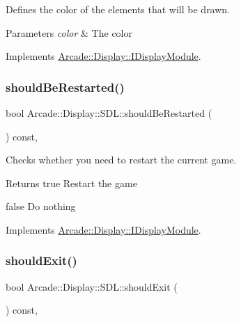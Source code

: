 Defines the color of the elements that will be drawn. 


\begin{DoxyParams}{Parameters}
{\em color} & The color \\
\hline
\end{DoxyParams}


Implements \mbox{\hyperlink{classArcade_1_1Display_1_1IDisplayModule_a9f81148f93a249d6fc91307819911b4e}{Arcade\+::\+Display\+::\+I\+Display\+Module}}.

\mbox{\label{classArcade_1_1Display_1_1SDL_aaeeb1aa505c0eab3c8b5c34265c89845}} 
\subsubsection{\texorpdfstring{shouldBeRestarted()}{shouldBeRestarted()}}
{\footnotesize\ttfamily bool Arcade\+::\+Display\+::\+S\+D\+L\+::should\+Be\+Restarted (\begin{DoxyParamCaption}{ }\end{DoxyParamCaption}) const\hspace{0.3cm}{\ttfamily [final]}, {\ttfamily [virtual]}}



Checks whether you need to restart the current game. 

\begin{DoxyReturn}{Returns}
true Restart the game 

false Do nothing 
\end{DoxyReturn}


Implements \mbox{\hyperlink{classArcade_1_1Display_1_1IDisplayModule_adc5d499229aa5899bbd4bae14f00cb27}{Arcade\+::\+Display\+::\+I\+Display\+Module}}.

\mbox{\label{classArcade_1_1Display_1_1SDL_adb5d8837174b0ca120a27a521320f9c0}} 
\subsubsection{\texorpdfstring{shouldExit()}{shouldExit()}}
{\footnotesize\ttfamily bool Arcade\+::\+Display\+::\+S\+D\+L\+::should\+Exit (\begin{DoxyParamCaption}{ }\end{DoxyParamCaption}) const\hspace{0.3cm}{\ttfamily [final]}, {\ttfamily [virtual]}}



